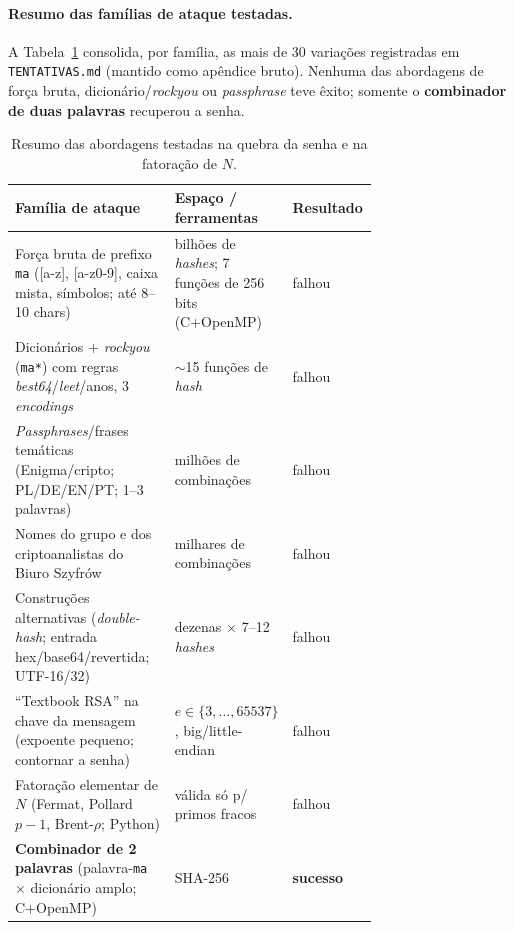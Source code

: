 \documentclass[11pt,a4paper]{article}
\begin{document}
\paragraph{Resumo das famílias de ataque testadas.} A Tabela~\ref{tab:resumo} consolida, por
família, as mais de 30 variações registradas em \texttt{TENTATIVAS.md} (mantido como apêndice bruto).
Nenhuma das abordagens de força bruta, dicionário/\emph{rockyou} ou \emph{passphrase} teve êxito;
somente o \textbf{combinador de duas palavras} recuperou a senha.

\begin{table}[h]
\centering\small
\begin{tabular}{p{0.44\linewidth} p{0.28\linewidth} l}
\toprule
\textbf{Família de ataque} & \textbf{Espaço / ferramentas} & \textbf{Resultado}\\
\midrule
Força bruta de prefixo \texttt{ma} ([a-z], [a-z0-9], caixa mista, símbolos; até 8--10 chars) & bilhões de \emph{hashes}; 7 funções de 256 bits (C+OpenMP) & falhou\\
Dicionários $+$ \emph{rockyou} (\texttt{ma*}) com regras \emph{best64}/\emph{leet}/anos, 3 \emph{encodings} & $\sim$15 funções de \emph{hash} & falhou\\
\emph{Passphrases}/frases temáticas (Enigma/cripto; PL/DE/EN/PT; 1--3 palavras) & milhões de combinações & falhou\\
Nomes do grupo e dos criptoanalistas do Biuro Szyfrów & milhares de combinações & falhou\\
Construções alternativas (\emph{double-hash}; entrada hex/base64/revertida; UTF-16/32) & dezenas $\times$ 7--12 \emph{hashes} & falhou\\
``Textbook RSA'' na chave da mensagem (expoente pequeno; contornar a senha) & $e\in\{3,\dots,65537\}$, big/little-endian & falhou\\
Fatoração elementar de $N$ (Fermat, Pollard $p\!-\!1$, Brent-$\rho$; Python) & válida só p/ primos fracos & falhou\\
\midrule
\textbf{Combinador de 2 palavras} (palavra-\texttt{ma} $\times$ dicionário amplo; C+OpenMP) & SHA-256 & \textbf{sucesso}\\
\bottomrule
\end{tabular}
\caption{Resumo das abordagens testadas na quebra da senha e na fatoração de $N$.}
\label{tab:resumo}
\end{table}
\end{document}
